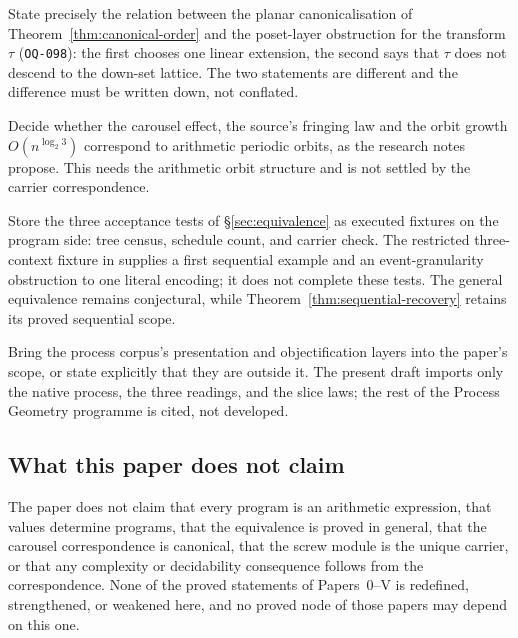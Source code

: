 \begin{problem}\label{prob:layers}
State precisely the relation between the planar canonicalisation of
Theorem~\ref{thm:canonical-order} and the poset-layer obstruction for the transform
$\tau$ (\texttt{OQ-098}): the first chooses one linear extension, the second says that
$\tau$ does not descend to the down-set lattice.  The two statements are different and
the difference must be written down, not conflated.
\end{problem}

\begin{problem}\label{prob:fringing}
Decide whether the carousel effect, the source's fringing law and the orbit growth
$O(n^{\log_{2}3})$ correspond to arithmetic periodic orbits, as the research notes
propose.  This needs the arithmetic orbit structure and is not settled
by the carrier correspondence.
\end{problem}

\begin{problem}\label{prob:fixtures}
Store the three acceptance tests of \S\ref{sec:equivalence} as executed fixtures on
the program side: tree census, schedule count, and carrier check.  The restricted
three-context fixture in  supplies a first
sequential example and an event-granularity obstruction to one literal encoding;
it does not complete these tests.  The general equivalence remains conjectural,
while Theorem~\ref{thm:sequential-recovery} retains its proved sequential scope.
\end{problem}

\begin{problem}\label{prob:presentation}
Bring the process corpus's presentation and objectification layers into the paper's
scope, or state explicitly that they are outside it.  The present draft imports only
the native process, the three readings, and the slice laws; the rest of the Process
Geometry programme is cited, not developed.
\end{problem}

\subsection{What this paper does not claim}

The paper does not claim that every program is an arithmetic expression, that values
determine programs, that the equivalence is proved in general, that the carousel
correspondence is canonical, that the screw module is the unique carrier, or that any
complexity or decidability consequence follows from the correspondence.  None of the
proved statements of Papers~0--V is redefined, strengthened, or weakened here, and no
proved node of those papers may depend on this one.

